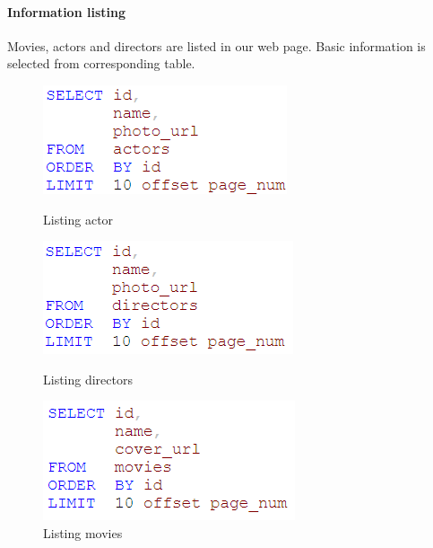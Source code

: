 \begin{CJK*}{UTF8}{gbsn}
\paragraph{Information listing}Movies, actors and directors are listed in our web page. Basic information is selected from corresponding table.
\begin{figure}[htbp]
\centering
\begin{minipage}{0.32\textwidth}
\includegraphics[width=\linewidth]{a_list.png}
\caption{Listing actor}
\end{minipage}
\begin{minipage}{0.32\textwidth}
\includegraphics[width=\linewidth]{dir_list.png}
\caption{Listing directors}
\end{minipage}
\begin{minipage}{0.32\textwidth}
\includegraphics[width=\linewidth]{m_list.png}
\caption{Listing movies}
\end{minipage}
\end{figure}


\end{CJK*}
